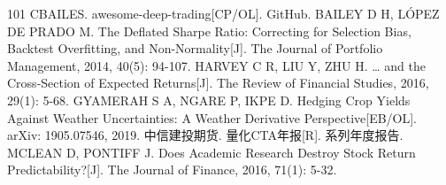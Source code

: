 \documentclass[12pt,a4paper]{ctexart}
\begin{document}
\begin{thebibliography}{101}
 CBAILES. awesome-deep-trading[CP/OL]. GitHub.
 BAILEY D H, LÓPEZ DE PRADO M. The Deflated Sharpe Ratio: Correcting for Selection Bias, Backtest Overfitting, and Non-Normality[J]. The Journal of Portfolio Management, 2014, 40(5): 94-107.
 HARVEY C R, LIU Y, ZHU H. … and the Cross-Section of Expected Returns[J]. The Review of Financial Studies, 2016, 29(1): 5-68.
 GYAMERAH S A, NGARE P, IKPE D. Hedging Crop Yields Against Weather Uncertainties: A Weather Derivative Perspective[EB/OL]. arXiv: 1905.07546, 2019.
 中信建投期货. 量化CTA年报[R]. 系列年度报告.
 MCLEAN D, PONTIFF J. Does Academic Research Destroy Stock Return Predictability?[J]. The Journal of Finance, 2016, 71(1): 5-32.
\end{thebibliography}

\end{document}
